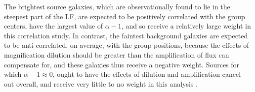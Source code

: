 \begin{table}
  \begin{center}


   \caption[Luminosity Function Parameters]{\ac{LF} (Schechter) parameters from external \ac{LBG} measurements. $^a$ \ac{LF} parameters from \protect \citet{vanderBurg10}. $^b$ \ac{LF} parameters from \protect \citet{Sawicki06}.}
 \label{LFtable2}
  \end{center}
\end{table}


The brightest source galaxies, which are observationally found to lie in the steepest part of the \ac{LF}, are expected to be positively correlated with the group centers, have the largest value of $\alpha-1$, and so receive a relatively large weight in this correlation study.  In contrast, the faintest background galaxies are expected to be anti-correlated, on average, with the group positions, because the effects of magnification dilution should be greater than the amplification of flux can compensate for, and these galaxies thus receive a negative weight.  Sources for which $\alpha-1 \approx 0$, ought to have the effects of dilution and amplification cancel out overall, and receive very little to no weight in this analysis \citep{Scranton05}. 

